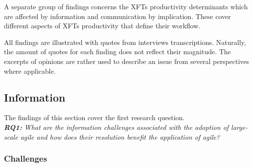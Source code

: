 A separate group of findings concerns the \acp{XFT} productivity determinants which are affected by information and communication by implication. These cover different aspects of \acp{XFT} productivity that define their workflow.

All findings are illustrated with quotes from interviews transcriptions. Naturally, the amount of quotes for each finding does not reflect their magnitude. The excerpts of opinions are rather used to describe an issue from several perspectives where applicable.

\subsection{Information}

The findings of this section cover the first research question.\\
\textit{\textbf{RQ1:} What are the information challenges associated with the adoption of large-scale agile and how does their resolution benefit the application of agile?}

\subsubsection{Challenges}
\label{chap:findings-information-challenges}

